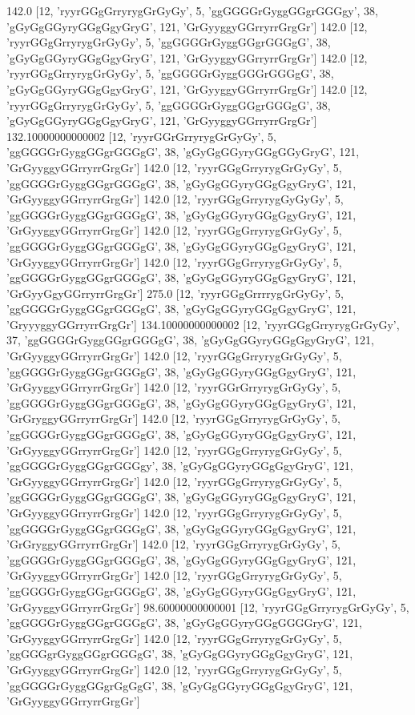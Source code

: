 142.0 [12, 'ryyrGGgGrryrygGrGyGy', 5, 'ggGGGGrGyggGGgrGGGgy', 38, 'gGyGgGGyryGGgGgyGryG', 121, 'GrGyyggyGGrryrrGrgGr']
142.0 [12, 'ryyrGGgGrryrygGrGyGy', 5, 'ggGGGGrGyggGGgrGGGgG', 38, 'gGyGgGGyryGGgGgyGryG', 121, 'GrGyyggyGGrryrrGrgGr']
142.0 [12, 'ryyrGGgGrryrygGrGyGy', 5, 'ggGGGGrGyggGGGrGGGgG', 38, 'gGyGgGGyryGGgGgyGryG', 121, 'GrGyyggyGGrryrrGrgGr']
142.0 [12, 'ryyrGGgGrryrygGrGyGy', 5, 'ggGGGGrGyggGGgrGGGgG', 38, 'gGyGgGGyryGGgGgyGryG', 121, 'GrGyyggyGGrryrrGrgGr']
132.10000000000002 [12, 'ryyrGGrGrryrygGrGyGy', 5, 'ggGGGGrGyggGGgrGGGgG', 38, 'gGyGgGGyryGGgGGyGryG', 121, 'GrGyyggyGGrryrrGrgGr']
142.0 [12, 'ryyrGGgGrryrygGrGyGy', 5, 'ggGGGGrGyggGGgrGGGgG', 38, 'gGyGgGGyryGGgGgyGryG', 121, 'GrGyyggyGGrryrrGrgGr']
142.0 [12, 'ryyrGGgGrryrygGyGyGy', 5, 'ggGGGGrGyggGGgrGGGgG', 38, 'gGyGgGGyryGGgGgyGryG', 121, 'GrGyyggyGGrryrrGrgGr']
142.0 [12, 'ryyrGGgGrryrygGrGyGy', 5, 'ggGGGGrGyggGGgrGGGgG', 38, 'gGyGgGGyryGGgGgyGryG', 121, 'GrGyyggyGGrryrrGrgGr']
142.0 [12, 'ryyrGGgGrryrygGrGyGy', 5, 'ggGGGGrGyggGGgrGGGgG', 38, 'gGyGgGGyryGGgGgyGryG', 121, 'GrGyyGgyGGrryrrGrgGr']
275.0 [12, 'ryyrGGgGrrrrygGrGyGy', 5, 'ggGGGGrGyggGGgrGGGgG', 38, 'gGyGgGGyryGGgGgyGryG', 121, 'GryyyggyGGrryrrGrgGr']
134.10000000000002 [12, 'ryyrGGgGrryrygGrGyGy', 37, 'ggGGGGrGyggGGgrGGGgG', 38, 'gGyGgGGyryGGgGgyGryG', 121, 'GrGyyggyGGrryrrGrgGr']
142.0 [12, 'ryyrGGgGrryrygGrGyGy', 5, 'ggGGGGrGyggGGgrGGGgG', 38, 'gGyGgGGyryGGgGgyGryG', 121, 'GrGyyggyGGrryrrGrgGr']
142.0 [12, 'ryyrGGrGrryrygGrGyGy', 5, 'ggGGGGrGyggGGgrGGGgG', 38, 'gGyGgGGyryGGgGgyGryG', 121, 'GrGryggyGGrryrrGrgGr']
142.0 [12, 'ryyrGGgGrryrygGrGyGy', 5, 'ggGGGGrGyggGGgrGGGgG', 38, 'gGyGgGGyryGGgGgyGryG', 121, 'GrGyyggyGGrryrrGrgGr']
142.0 [12, 'ryyrGGgGrryrygGrGyGy', 5, 'ggGGGGrGyggGGgrGGGgy', 38, 'gGyGgGGyryGGgGgyGryG', 121, 'GrGyyggyGGrryrrGrgGr']
142.0 [12, 'ryyrGGgGrryrygGrGyGy', 5, 'ggGGGGrGyggGGgrGGGgG', 38, 'gGyGgGGyryGGgGgyGryG', 121, 'GrGyyggyGGrryrrGrgGr']
142.0 [12, 'ryyrGGgGrryrygGrGyGy', 5, 'ggGGGGrGyggGGgrGGGgG', 38, 'gGyGgGGyryGGgGgyGryG', 121, 'GrGryggyGGrryrrGrgGr']
142.0 [12, 'ryyrGGgGrryrygGrGyGy', 5, 'ggGGGGrGyggGGgrGGGgG', 38, 'gGyGgGGyryGGgGgyGryG', 121, 'GrGyyggyGGrryrrGrgGr']
142.0 [12, 'ryyrGGgGrryrygGrGyGy', 5, 'ggGGGGrGyggGGgrGGGgG', 38, 'gGyGgGGyryGGgGgyGryG', 121, 'GrGyyggyGGrryrrGrgGr']
98.60000000000001 [12, 'ryyrGGgGrryrygGrGyGy', 5, 'ggGGGGrGyggGGgrGGGgG', 38, 'gGyGgGGyryGGgGGGGryG', 121, 'GrGyyggyGGrryrrGrgGr']
142.0 [12, 'ryyrGGgGrryrygGrGyGy', 5, 'ggGGGgrGyggGGgrGGGgG', 38, 'gGyGgGGyryGGgGgyGryG', 121, 'GrGyyggyGGrryrrGrgGr']
142.0 [12, 'ryyrGGgGrryrygGrGyGy', 5, 'ggGGGGrGyggGGgrGgGgG', 38, 'gGyGgGGyryGGgGgyGryG', 121, 'GrGyyggyGGrryrrGrgGr']
